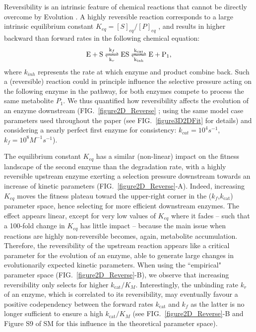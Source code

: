\documentclass[11pt,onecolumn]{article}
\begin{document}
Reversibility is an intrinsic feature of chemical reactions that cannot be directly overcome by Evolution \citep{Haldane30,Cornish-Bowden79a}. A highly reversible reaction corresponds to a large intrinsic equilibrium constant $K_{eq}=[S]_{eq}/[P]_{eq}$ \citep{Klipp94}, and results in higher backward than forward rates in the following chemical equation: \begin{equation}
\ce{ E + S <=>[k_{f}][k_{r}] ES <=>[k_{cat}][k_{inh}] E + P_1 },
\label{chemMM_fullrev}
\end{equation}
where $k_{inh}$ represents the rate at which enzyme and product combine back. Such a (reversible) reaction could in principle influence the selective pressure acting on the following enzyme in the pathway, for both enzymes compete to process the same metabolite $P_1$. We thus quantified how reversibility affects the evolution of an enzyme downstream (FIG.~\ref{figure2D_Reverse} ; using the same model case parameters used throughout the paper (see FIG.~\ref{figure3D2DFit}
for details) and considering a nearly perfect first enzyme for consistency: $k_{cat}=10^4s^{-1}$,$k_f=10^8M^{-1}s^{-1}$).

The equilibrium constant $K_{eq}$ has a similar (non-linear) impact on the fitness landscape of the second enzyme than the degradation rate, with a highly reversible upstream enzyme exerting a selection pressure downstream towards an increase of kinetic parameters (FIG.~\ref{figure2D_Reverse}-A). Indeed, increasing $K_{eq}$ moves the fitness plateau toward the upper-right corner in the ($k_f$,$k_\text{cat}$) parameter space, hence selecting for more efficient downstream enzymes. The effect appears linear, except for very low values of $K_{eq}$ where it fades -- such that a 100-fold change in $K_{eq}$ has little impact -- because the main issue when reactions are highly non-reversible becomes, again, metabolite accumulation. Therefore, the reversibility of the upstream reaction appears like a critical parameter for the evolution of an enzyme, able to generate large changes in evolutionarily expected kinetic parameters. When using the ``empirical" parameter space (FIG.~\ref{figure2D_Reverse}-B), we observe that increasing reversibility only selects for higher $k_\text{cat}/K_M$. Interestingly, the unbinding rate $k_r$ of an enzyme, which is correlated to its reversibility, may eventually favour a positive codependency between the forward rates $k_\text{cat}$ and $k_f$ as the latter is no longer sufficient to ensure a high $k_\text{cat}/K_M$ (see FIG.~\ref{figure2D_Reverse}-B and Figure S9 of SM for this influence in the theoretical parameter space).
\end{document}
